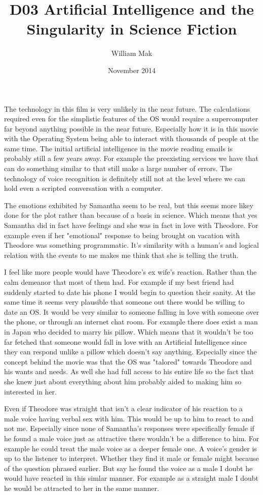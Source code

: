\documentclass{article}
\title{D03 Artificial Intelligence and the Singularity in Science Fiction}
\author{William Mak}
\date{November 2014}
\begin{document}
\maketitle

The technology in this film is very unlikely in the near future. The
calculations required even for the simplistic features of the OS would require a
supercomputer far beyond anything possible in the near future. Especially how it
is in this movie with the Operating System being able to interact with thousands
of people at the same time. The initial artificial intelligence in the movie
reading emails is probably still a few years away. For example the preexisting
services we have that can do something similar to that still make a large number
of errors. The technology of voice recognition is definitely still not at the
level where we can hold even a scripted conversation with a computer. 

The emotions exhibited by Samantha seem to be real, but this seems more likey
done for the plot rather than because of a basis in science. Which means that
yes Samantha did in fact have feelings and she was in fact in love with
Theodore. For example even if her "emotional" response to being brought on
vacation with Theodore was something programmatic. It's similarity with a
human's and logical relation with the events to me makes me think that she is
telling the truth.

I feel like more people would have Theodore's ex wife's reaction. Rather than
the calm demeanor that most of them had. For example if my best friend had
suddenly started to date his phone I would begin to question their sanity. At
the same time it seems very plausible that someone out there would be willing to
date an OS. It would be very similar to someone falling in love with someone
over the phone, or through an internet chat room. For example there does exist a
man in Japan who decided to marry his pillow. Which means that it wouldn't be
too far fetched that someone would fall in love with an Artificial Intelligence
since they can respond unlike a pillow which doesn't say anything. Especially 
since the concept behind the movie was that the OS was "talored" towards 
Theodore and his wants and needs. As well she had full access to his entire life 
so the fact that she knew just about everything about him probably aided to 
making him so interested in her. 

Even if Theodore was straight that isn't a clear indicator of his reaction to a
male voice having verbal sex with him. This would be up to him to react to and
not me. Especially since none of Samantha's responses were specifically female
if he found a male voice just as attractive there wouldn't be a difference to
him. For example he could treat the male voice as a deeper female one. A voice's
gender is up to the listener to interpret. Whether they find it male or female
might because of the question phrased earlier. But say he found the voice as a
male I doubt he would have reacted in this simlar manner. For example as a
straight male I doubt he would be attracted to her in the same manner.
\end{document}
